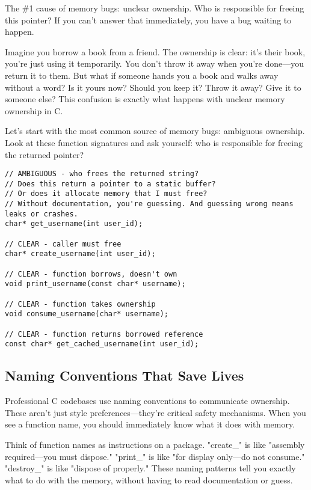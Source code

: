 The \#1 cause of memory bugs: unclear ownership. Who is responsible for freeing this pointer? If you can't answer that immediately, you have a bug waiting to happen.

Imagine you borrow a book from a friend. The ownership is clear: it's their book, you're just using it temporarily. You don't throw it away when you're done---you return it to them. But what if someone hands you a book and walks away without a word? Is it yours now? Should you keep it? Throw it away? Give it to someone else? This confusion is exactly what happens with unclear memory ownership in C.

Let's start with the most common source of memory bugs: ambiguous ownership. Look at these function signatures and ask yourself: who is responsible for freeing the returned pointer?

\begin{lstlisting}
// AMBIGUOUS - who frees the returned string?
// Does this return a pointer to a static buffer?
// Or does it allocate memory that I must free?
// Without documentation, you're guessing. And guessing wrong means leaks or crashes.
char* get_username(int user_id);

// CLEAR - caller must free
char* create_username(int user_id);

// CLEAR - function borrows, doesn't own
void print_username(const char* username);

// CLEAR - function takes ownership
void consume_username(char* username);

// CLEAR - function returns borrowed reference
const char* get_cached_username(int user_id);
\end{lstlisting}

\subsection{Naming Conventions That Save Lives}

Professional C codebases use naming conventions to communicate ownership. These aren't just style preferences---they're critical safety mechanisms. When you see a function name, you should immediately know what it does with memory.

Think of function names as instructions on a package. "create\_" is like "assembly required---you must dispose." "print\_" is like "for display only---do not consume." "destroy\_" is like "dispose of properly." These naming patterns tell you exactly what to do with the memory, without having to read documentation or guess.

